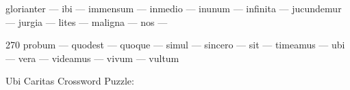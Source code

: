 \documentclass[12pt]{article}
\begin{document}
\pagestyle{fancy}
\fancyhf{}
\renewcommand{\headrulewidth}{0pt}
\renewcommand{\footrulewidth}{0pt}
\libertine
\renewcommand\PuzzleClueFont{\rm\normalsize}
\noindent\begin{rotate}{0}
\small glorianter --- ibi --- immensum --- inmedio --- inunum --- infinita --- jucundemur --- jurgia --- lites --- maligna --- nos --- 
\end{rotate}
\hfill
\begin{rotate}{270}
\small probum --- quodest --- quoque --- simul --- sincero --- sit --- timeamus --- ubi --- vera --- videamus --- vivum --- vultum
\end{rotate}
\begin{center}
  \huge{Ubi Caritas Crossword Puzzle:}
\end{center}
\vspace{1.5cm}
\end{document}
